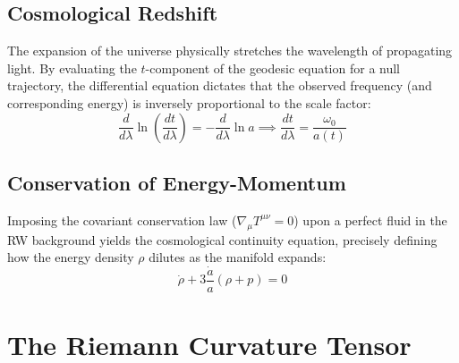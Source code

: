 \documentclass[11pt, a4paper]{report}
\begin{document}
\subsection*{Cosmological Redshift}
The expansion of the universe physically stretches the wavelength of propagating light. By evaluating the $t$-component of the geodesic equation for a null trajectory, the differential equation dictates that the observed frequency (and corresponding energy) is inversely proportional to the scale factor:
\begin{equation}
\frac{d}{d\lambda} \ln \left( \frac{dt}{d\lambda} \right) = - \frac{d}{d\lambda} \ln a \implies \frac{dt}{d\lambda} = \frac{\omega_0}{a(t)}
\end{equation}

\subsection*{Conservation of Energy-Momentum}
Imposing the covariant conservation law ($\nabla_\mu T^{\mu\nu} = 0$) upon a perfect fluid in the RW background yields the cosmological continuity equation, precisely defining how the energy density $\rho$ dilutes as the manifold expands:
\begin{equation}
\dot{\rho} + 3\frac{\dot{a}}{a} (\rho + p) = 0
\end{equation}

\section{The Riemann Curvature Tensor}
\end{document}
